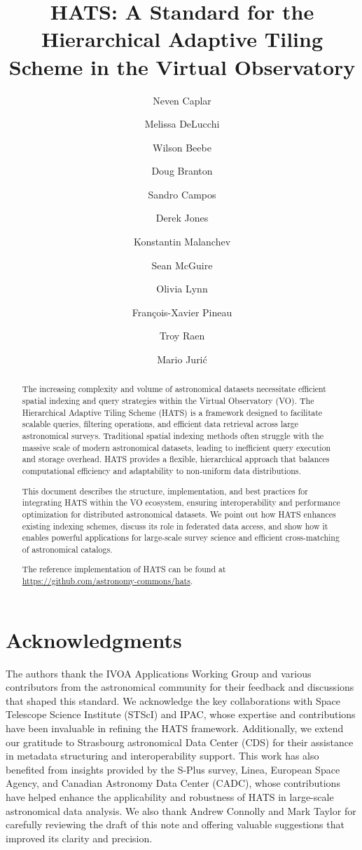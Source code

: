 \documentclass[11pt,a4paper]{ivoa}
\title{HATS: A Standard for the Hierarchical Adaptive Tiling Scheme in the Virtual Observatory}
\author[https://www.ivoa.net/authors/caplar]{Neven Caplar}
\author[https://www.ivoa.net/authors/delucchi]{Melissa DeLucchi}
\author[https://www.ivoa.net/authors/beebe]{Wilson Beebe}
\author[https://www.ivoa.net/authors/branton]{Doug Branton}
\author[https://www.ivoa.net/authors/campos]{Sandro Campos}
\author[https://www.ivoa.net/authors/jones]{Derek Jones}
\author[https://www.ivoa.net/authors/malanchev]{Konstantin Malanchev}
\author[https://www.ivoa.net/authors/mcguire]{Sean McGuire}
\author[https://www.ivoa.net/authors/lynn]{Olivia Lynn}
\author[https://www.ivoa.net/authors/pineau]{François-Xavier Pineau}
\author[https://www.ivoa.net/authors/raen]{Troy Raen}
\author[https://www.ivoa.net/authors/juric]{Mario Juri\'{c}}
\begin{document}
\begin{abstract}
The increasing complexity and volume of astronomical datasets necessitate efficient spatial indexing and query strategies within the Virtual Observatory (VO). 
The Hierarchical Adaptive Tiling Scheme (HATS) is a framework designed to facilitate scalable queries, filtering operations, and efficient data retrieval across large astronomical surveys. 
Traditional spatial indexing methods often struggle with the massive scale of modern astronomical datasets, leading to inefficient query execution and storage overhead. 
HATS provides a flexible, hierarchical approach that balances computational efficiency and adaptability to non-uniform data distributions.\par

This document describes the structure, implementation, and best practices for integrating HATS within the VO ecosystem, ensuring interoperability and performance optimization for distributed astronomical datasets. We point out how HATS enhances existing indexing schemes, discuss its role in federated data access, and show how it enables powerful applications for large-scale survey science and efficient cross-matching of astronomical catalogs. \par 
The reference implementation of HATS can be found at \url{https://github.com/astronomy-commons/hats}. 

\end{abstract}

\section*{Acknowledgments}
The authors thank the IVOA Applications Working Group and various contributors from the astronomical community for their feedback and discussions that shaped this standard. 
We acknowledge the key collaborations with Space Telescope Science Institute (STScI) and IPAC, whose expertise and contributions have been invaluable in refining the HATS framework. 
Additionally, we extend our gratitude to  Strasbourg astronomical Data Center (CDS) for their assistance in metadata structuring and interoperability support. 
This work has also benefited from insights provided by the S-Plus survey, Linea, European Space Agency, and Canadian Astronomy Data Center (CADC), whose contributions have helped enhance the applicability and robustness of HATS in large-scale astronomical data analysis.
We also thank Andrew Connolly and Mark Taylor for carefully reviewing the draft of this note and offering valuable suggestions that improved its clarity and precision. \par
\end{document}
